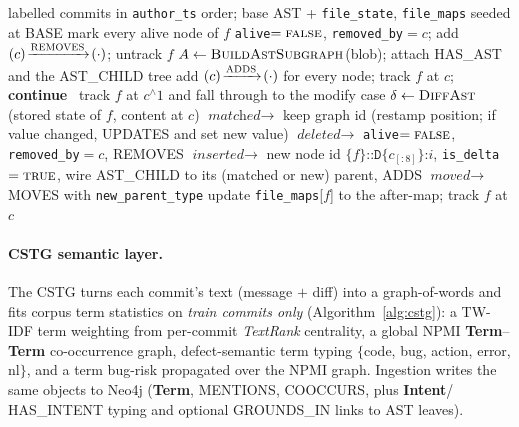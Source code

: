 \documentclass[11pt,a4paper]{article}
\newcommand{\code}[1]{\texttt{#1}}
\newcommand{\node}[1]{\textcolor{kgblue}{\textbf{#1}}}
\newcommand{\edge}[1]{\textsc{#1}}
\begin{document}
	\begin{algorithm}[H]
	\caption{Online AST delta-layer growth}\label{alg:online}
	\begin{algorithmic}[1]
	\Require labelled commits in \code{author\_ts} order; base AST + \code{file\_state}, \code{file\_maps} seeded at BASE
	  \For{each changed \code{.java} file $(s,f)$ of $c$, $s\in\{A,M,D\}$}
	        \State mark every alive node of $f$ \code{alive}$=\textsc{false}$, \code{removed\_by}$=c$; add $(c)\!\xrightarrow{\edge{REMOVES}}\!(\cdot)$; untrack $f$
	      
	        \State $A \gets \textsc{BuildAstSubgraph}$(blob); attach \edge{HAS\_AST} and the \edge{AST\_CHILD} tree
	         add $(c)\!\xrightarrow{\edge{ADDS}}\!(\cdot)$ for every node; track $f$ at $c$; \textbf{continue}
	        \Else\ track $f$ at $c^{\wedge}1$ and fall through to the modify case \EndIf
	     \EndIf
	        \State $\delta \gets \textsc{DiffAst}$(stored state of $f$, content at $c$) 
	        \State $\textit{matched}\!\to$ keep graph id (restamp position; if value changed, \edge{UPDATES} and set new value)
	        \State $\textit{deleted}\!\to$ \code{alive}$=\textsc{false}$, \code{removed\_by}$=c$, \edge{REMOVES}
	        \State $\textit{inserted}\!\to$ new node id $\{f\}\code{::D}\{c_{[:8]}\}\code{:}i$, \code{is\_delta}$=\textsc{true}$, wire \edge{AST\_CHILD} to its (matched or new) parent, \edge{ADDS}
	        \State $\textit{moved}\!\to$ \edge{MOVES} with \code{new\_parent\_type}
	        \State update \code{file\_maps}[$f$] to the after-map; track $f$ at $c$
	     \EndIf
	  \EndFor
	\EndFor
	\end{algorithmic}
	\end{algorithm}

	\paragraph{CSTG semantic layer.} The CSTG turns each commit's text (message
	$+$ diff) into a graph-of-words and fits corpus term statistics on \emph{train
	commits only} (Algorithm~\ref{alg:cstg}): a TW-IDF term weighting from per-commit
	\emph{TextRank} centrality, a global NPMI \node{Term}--\node{Term} co-occurrence
	graph, defect-semantic term typing $\{$code, bug, action, error, nl$\}$, and a
	term bug-risk propagated over the NPMI graph. Ingestion writes the same objects to
	Neo4j (\node{Term}, \edge{MENTIONS}, \edge{COOCCURS}, plus \node{Intent}/%
	\edge{HAS\_INTENT} typing and optional \edge{GROUNDS\_IN} links to AST leaves).
\end{document}
